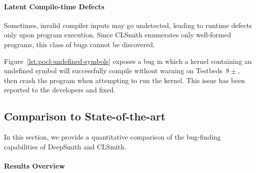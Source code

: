 \paragraph{Latent Compile-time Defects}

Sometimes, invalid compiler inputs may go undetected, leading to runtime defects
only upon program execution. Since CLSmith enumerates only well-formed programs,
this class of bugs cannot be discovered.

Figure~\ref{lst:pocl-undefined-symbols} exposes a bug in which a kernel
containing an undefined symbol will successfully compile without warning on
Testbeds~$8\pm$, then crash the program when attempting to run the kernel. This
issue has been reported to the developers and fixed.

\subsection{Comparison to State-of-the-art}%
\label{subsec:vs_clsmith}

In this section, we provide a quantitative comparison of the bug-finding
capabilities of DeepSmith and CLSmith.

\paragraph{Results Overview}

\begin{table}
  \centering %
  \caption{%
  Results from 48 hours of testing using CLSmith and DeepSmith. System \#. as
  per Table~\ref{tab:platforms}. $\pm$ denotes optimizations off ($-$) vs on
  ($+$). The remaining columns denote the number of build crash (\bc), build
  timeout (\bto), anomalous build failure (\abf), anomalous runtime crash
  (\arc), anomalous wrong-output (\awo), and pass (\textbf{\cmark}) results.
  }
  
  \label{tab:megatable}
\end{table}

